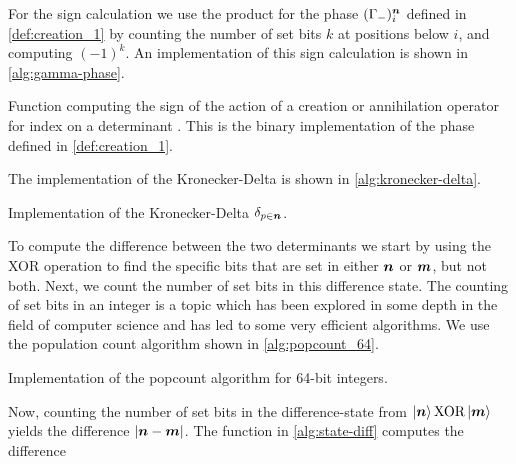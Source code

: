             For the sign calculation we use the product for the phase
            $(\Gamma_{-})^{\boldsymbol{n}}_i$ defined in \autoref{def:creation_1} by
            counting the number of set bits $k$ at positions below $i$, and
            computing $(-1)^k$.
            An implementation of this sign calculation is shown in
            \autoref{alg:gamma-phase}.
            \begin{algorithm}
                \caption{Function computing the sign of the action of a creation
                or annihilation operator for index  on a determinant
                .
                This is the binary implementation of the phase defined in
                \autoref{def:creation_1}.}
                \label{alg:gamma-phase}
            \end{algorithm}
            The implementation of the Kronecker-Delta is shown in
            \autoref{alg:kronecker-delta}.
            \begin{algorithm}
                \caption{Implementation of the Kronecker-Delta $\delta_{p \in
                \boldsymbol{n}}$.}
                \label{alg:kronecker-delta}
            \end{algorithm}
            To compute the difference between the two determinants we start by
            using the XOR operation to find the specific bits that are set in
            either $\boldsymbol{n}$ or $\boldsymbol{m}$, but not both.
            Next, we count the number of set bits in this difference state.
            The counting of set bits in an integer is a topic which has been
            explored in some depth in the field of computer science and has led
            to some very efficient algorithms.
            We use the population count algorithm \cite{wiki:popcount} shown in
            \autoref{alg:popcount_64}.
            \begin{algorithm}
                \caption{Implementation of the popcount algorithm for 64-bit
                integers.}
                \label{alg:popcount_64}
            \end{algorithm}
            Now, counting the number of set bits in the difference-state from
            $\ket{\boldsymbol{n}} \text{XOR} \ket{\boldsymbol{m}}$ yields the difference
            $\abs{\boldsymbol{n} - \boldsymbol{m}}$.
            The function in \autoref{alg:state-diff} computes the difference
